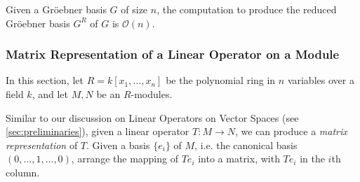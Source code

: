 \begin{corollary}
  Given a Gr\"oebner basis $G$ of size $n$, the computation to produce the reduced Gr\"oebner basis $G^R$ of $G$ is $\mathcal{O}(n)$. 
\end{corollary}

\subsubsection{Matrix Representation of a Linear Operator on a Module}

In this section, let $R = k[x_1, \ldots, x_n]$ be the polynomial ring in $n$ variables over a field $k$, and let $M, N$ be an $R$-modules.

Similar to our discussion on Linear Operators on Vector Spaces (see \cref{sec:preliminaries}), given a linear operator $T: M \to N$, we can produce a \emph{matrix representation} of $T$. Given a basis $\{ e_i \}$ of $M$, i.e. the canonical basis $(0, \ldots, 1, \ldots, 0)$, arrange the mapping of $Te_i$ into a matrix, with $Te_i$ in the $i$th column.

\begin{figure}[h]
\end{figure}